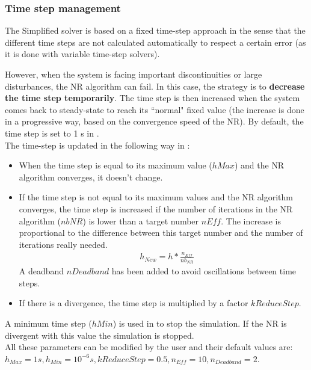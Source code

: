 \documentclass[a4paper, 12pt]{report}
\begin{document}
\subsubsection{Time step management}

The Simplified solver is based on a fixed time-step approach in the sense that the different time steps are not calculated automatically to respect a certain error (as it is done with variable time-step solvers).

However, when the system is facing important discontinuities or large disturbances, the \ac{NR} algorithm can fail. In this case, the strategy is to \textbf{decrease the time step temporarily}. The time step is then increased when the system comes back to steady-state to reach its ``normal" fixed value (the increase is done in a progressive way, based on the convergence speed of the \ac{NR}). By default, the time step is set to 1 s in \Dynawo. \\

The time-step is updated in the following way in \Dynawo:
\begin{itemize}
\item When the time step is equal to its maximum value ($hMax$) and the \ac{NR} algorithm converges, it doesn't change.
\item If the time step is not equal to its maximum values and the \ac{NR} algorithm converges, the time step is increased if the number of iterations in the \ac{NR} algorithm ($nbNR$) is lower than a target number $nEff$. The increase is proportional to the difference between this target number and the number of iterations really needed.
\begin{equation}
\begin{aligned}
& h_{New} = h * \frac{n_{Eff}}{nb_{NR}}
\end{aligned}
\end{equation}
A deadband $nDeadband$ has been added to avoid oscillations between time steps.
\item If there is a divergence, the time step is multiplied by a factor $kReduceStep$.
\end{itemize}
A minimum time step ($hMin$) is used in \Dynawo to stop the simulation. If the \ac{NR} is divergent with this value the simulation is stopped. \\

All these parameters can be modified by the user and their default values are: $h_{Max} = 1 s, h_{Min} = 10^{-6} s, kReduceStep = 0.5, n_{Eff} = 10, n_{Deadband} = 2 $.
\end{document}
